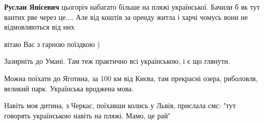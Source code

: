 \begin{itemize}
\begin{itemize}
 
\textbf{Руслан Янісевич} цьогоріч набагато більше на пляжі української. Бачили б як тут вантих рве через це.... Але від коштів за оренду житла і харчі чомусь вони не відмовляються від них
\end{itemize}

 
вітаю Вас з гарною поїздкою )

 
Зазирніть до Умані. Там теж практично всі українською, і є що глянути.

\begin{itemize}
 
Можна поїхати до Яготина, за 100 км від Києва, там прекрасні озера, риболовля, великий парк. Українська вроджена мова.
\end{itemize}

 

Навіть моя дитина, з Черкас, поїхавши колись у Львів, прислала смс: "тут
говорять українською навіть на пляжі. Мамо, це рай"

\begin{itemize}
 

\end{itemize}
\end{itemize}
